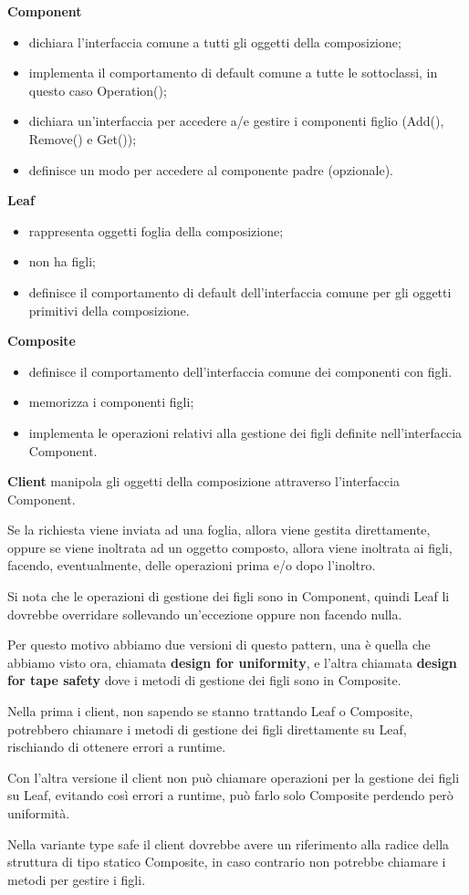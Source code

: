 \textbf{Component}
\begin{itemize}
    \item dichiara l’interfaccia comune a tutti gli oggetti della composizione;
    \item implementa il comportamento di default comune a tutte le sottoclassi, in questo caso Operation();
    \item dichiara un’interfaccia per accedere a/e gestire i componenti figlio (Add(), Remove() e Get());
    \item definisce un modo per accedere al componente padre (opzionale).
\end{itemize}

\textbf{Leaf}
\begin{itemize}
    \item rappresenta oggetti foglia della composizione;
    \item non ha figli;
    \item definisce il comportamento di default dell’interfaccia comune per gli oggetti primitivi della composizione.
\end{itemize} 

\textbf{Composite}
\begin{itemize}
    \item definisce il comportamento dell’interfaccia comune dei componenti con figli.
    \item memorizza i componenti figli;
    \item implementa le operazioni relativi alla gestione dei figli definite nell’interfaccia Component.
\end{itemize}

\textbf{Client} manipola gli oggetti della composizione attraverso l’interfaccia Component.

Se la richiesta viene inviata ad una foglia, allora viene gestita direttamente, oppure se viene inoltrata ad un oggetto composto, allora viene inoltrata ai figli, 
facendo, eventualmente, delle operazioni prima e/o dopo l’inoltro.

Si nota che le operazioni di gestione dei figli sono in Component, quindi Leaf li dovrebbe overridare sollevando un'eccezione oppure non facendo nulla.

Per questo motivo abbiamo due versioni di questo pattern, una è quella che abbiamo visto ora, chiamata \textbf{design for uniformity}, e l'altra chiamata 
\textbf{design for tape safety} dove i metodi di gestione dei figli sono in Composite.

Nella prima i client, non sapendo se stanno trattando Leaf o Composite, potrebbero chiamare i metodi di gestione dei figli direttamente su Leaf, rischiando di 
ottenere errori a runtime.

Con l'altra versione il client non può chiamare operazioni per la gestione dei figli su Leaf, evitando così errori a runtime, può farlo solo Composite perdendo però 
uniformità.

Nella variante type safe il client dovrebbe avere un riferimento alla radice della struttura di tipo statico Composite, in caso contrario non potrebbe chiamare i 
metodi per gestire i figli.
